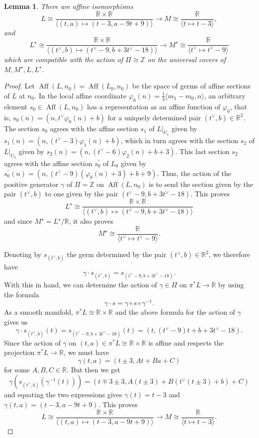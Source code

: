 \documentclass{article}
\newcommand{\RR}{\mathbb{R}}
\newcommand{\ZZ}{\mathbb{Z}}
\newcommand{\op}[1]{\operatorname{#1}}
\newtheorem{lemma}{Lemma}
\begin{document}
\begin{lemma}\label{lemma:AffineIso}
    There are affine isomorphisms 
    \[
L \cong \frac{\RR\times\RR}{\langle (t,a)\mapsto (t-3,a-9t+9)\rangle} \longrightarrow M \cong \frac{\RR}{\langle t\mapsto t-3\rangle},
\]
and 
\[
L^\star \cong \frac{\RR\times\RR}{\langle (t^\vee,b)\mapsto (t^\vee-9,b+3t^\vee-18)\rangle} \longrightarrow M^\star \cong \frac{\RR}{\langle t^\vee\mapsto t^\vee-9\rangle}
\]
which are compatible with the action of $\Pi\cong\ZZ$ on the universal covers  of $M,M^\star,L,L^\star$.
\end{lemma}
\begin{proof}
Let $\op{Aff}(L,n_0)=\op{Aff}(L_0,n_0)$ be the space of germs of affine sections of $L$ at $n_0$. In the local affine coordinate $\varphi_0(n)=\frac{1}{3}\langle m_1 - m_0,n\rangle$, an arbitrary element $s_0\in \op{Aff}(L,n_0)$ has a representation as an affine function of $\varphi_0$, that is, $s_0(n) = (n,t^\vee\varphi_0(n)+b)$ for a uniquely determined pair $(t^\vee,b)\in \RR^2$. The section $s_0$ agrees with the affine section $s_1$ of $L|_{U_1}$ given by $s_1(n)=(n,(t^\vee-3)\varphi_1(n)+b)$, which in turn agrees with the section $s_2$ of $L|_{U_2}$ given by $s_2(n)=(n,(t^\vee-6)\varphi_2(n)+b+3)$. This last section $s_2$ agrees with the affine section $s_0^\prime$ of $L_0$ given by $s_0^\prime(n) = (n,(t^\vee-9)(\varphi_0(n)+3)+b+9)$. Thus, the action  of the positive generator $\gamma$ of $\Pi=\ZZ$ on $\op{Aff}(L,n_0)$ is to send the section given by the pair  $(t^\vee, b)$ to one given by the pair $(t^\vee - 9, b+3t^\vee-18)$. This proves 
\[L^\star \cong \frac{\RR\times\RR}{\langle (t^\vee,b)\mapsto (t^\vee-9,b+3t^\vee-18)\rangle}
\]
and since $M^\star = L^\star/\RR$, it also proves 
\[
M^\star \cong \frac{\RR}{\langle t^\vee \mapsto t^\vee -9\rangle}.
\]

Denoting by $s_{(t^\vee,b)}$ the germ determined by the pair $(t^\vee, b)\in \RR^2$, we therefore have 
\[
\gamma \cdot s_{(t^\vee,b)} = s_{(t^\vee - 9, b+3t^\vee - 18)}.
\]
With this in hand, we can determine the action of $\gamma\in \Pi$ on $\pi^* L \to \RR$ by using the formula 
\[
\gamma \cdot s = \gamma\circ s \circ \gamma^{-1}.
\]
As a smooth manifold, $\pi^*L \cong \RR\times \RR$ and the above formula for the action of $\gamma$ gives us 
\[
\gamma\cdot s_{(t^\vee,b)}(t) = s_{(t^\vee-9,b+3t^\vee-18)}(t) = (t,(t^\vee-9)t + b+3t^\vee -18).
\]
Since the action of $\gamma$ on $(t,a)\in \pi^*L\cong \RR\times\RR$ is affine and respects the projection $\pi^*L\to \RR$, we must have 
\[
\gamma(t,a)= (t\pm 3, At + Ba + C)
\]
for some $A, B, C \in \RR$. But then we get 
\[
\gamma(s_{(t^\vee,b)}(\gamma^{-1}(t)))=(t\mp 3\pm 3, A(t\pm 3)+B(t^\vee(t\pm 3)+b)+C)
\]
and equating the two expressions gives $\gamma(t)=t-3$ and $\gamma(t,a)=(t-3,a-9t+9)$. This proves 
  \[
L \cong \frac{\RR\times\RR}{\langle (t,a)\mapsto (t-3,a-9t+9)\rangle} \longrightarrow M \cong \frac{\RR}{\langle t\mapsto t-3\rangle}.
\]
\end{proof}
\end{document}
